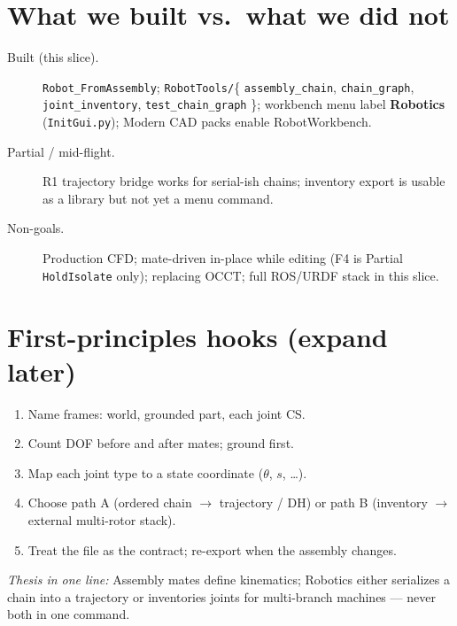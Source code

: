 \section*{What we built vs.\ what we did not}

\begin{description}
  \item[Built (this slice).] \texttt{Robot\_FromAssembly}; \texttt{RobotTools/}\{ \texttt{assembly\_chain}, \texttt{chain\_graph}, \texttt{joint\_inventory}, \texttt{test\_chain\_graph} \}; workbench menu label \textbf{Robotics} (\texttt{InitGui.py}); Modern CAD packs enable RobotWorkbench.
  \item[Partial / mid-flight.] R1 trajectory bridge works for serial-ish chains; inventory export is usable as a library but not yet a menu command.
  \item[Non-goals.] Production CFD; mate-driven in-place while editing (F4 is Partial \texttt{HoldIsolate} only); replacing OCCT; full ROS/URDF stack in this slice.
\end{description}

\section*{First-principles hooks (expand later)}

\begin{enumerate}
  \item Name frames: world, grounded part, each joint CS.
  \item Count DOF before and after mates; ground first.
  \item Map each joint type to a state coordinate ($\theta$, $s$, \ldots).
  \item Choose path A (ordered chain $\to$ trajectory / DH) or path B (inventory $\to$ external multi-rotor stack).
  \item Treat the file as the contract; re-export when the assembly changes.
\end{enumerate}

\noindent\textit{Thesis in one line:} Assembly mates define kinematics; Robotics either serializes a chain into a trajectory or inventories joints for multi-branch machines --- never both in one command.


